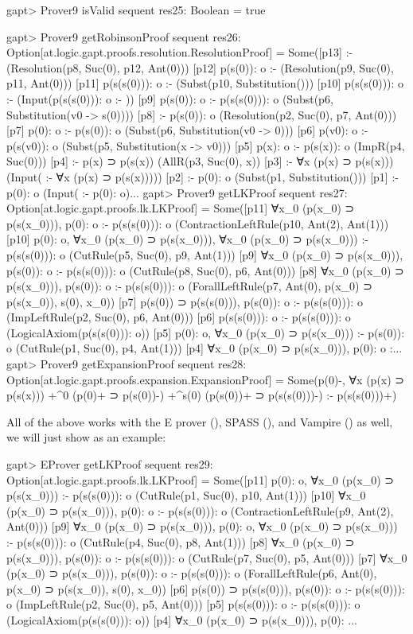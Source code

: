 \documentclass[a4paper,11pt]{article}
\newcommand{\cli}[1]{{\ttfamily {#1}}}
\begin{document}
\begin{clilisting}
gapt> Prover9 isValid sequent
res25: Boolean = true

gapt> Prover9 getRobinsonProof sequent
res26: Option[at.logic.gapt.proofs.resolution.ResolutionProof] =
Some([p13]  :-    (Resolution(p8, Suc(0), p12, Ant(0)))
[p12] p(s(0)): o :-    (Resolution(p9, Suc(0), p11, Ant(0)))
[p11] p(s(s(0))): o :-    (Subst(p10, Substitution()))
[p10] p(s(s(0))): o :-    (Input(p(s(s(0))): o :- ))
[p9] p(s(0)): o :- p(s(s(0))): o   (Subst(p6, Substitution(v0 -> s(0))))
[p8]  :- p(s(0)): o   (Resolution(p2, Suc(0), p7, Ant(0)))
[p7] p(0): o :- p(s(0)): o   (Subst(p6, Substitution(v0 -> 0)))
[p6] p(v0): o :- p(s(v0)): o   (Subst(p5, Substitution(x -> v0)))
[p5] p(x): o :- p(s(x)): o   (ImpR(p4, Suc(0)))
[p4]  :- p(x) ⊃ p(s(x))   (AllR(p3, Suc(0), x))
[p3]  :- ∀x (p(x) ⊃ p(s(x)))   (Input( :- ∀x (p(x) ⊃ p(s(x)))))
[p2]  :- p(0): o   (Subst(p1, Substitution()))
[p1]  :- p(0): o   (Input( :- p(0): o)...
gapt> Prover9 getLKProof sequent
res27: Option[at.logic.gapt.proofs.lk.LKProof] =
Some([p11] ∀x_0 (p(x_0) ⊃ p(s(x_0))), p(0): o :- p(s(s(0))): o    (ContractionLeftRule(p10, Ant(2), Ant(1)))
[p10] p(0): o, ∀x_0 (p(x_0) ⊃ p(s(x_0))), ∀x_0 (p(x_0) ⊃ p(s(x_0))) :- p(s(s(0))): o    (CutRule(p5, Suc(0), p9, Ant(1)))
[p9] ∀x_0 (p(x_0) ⊃ p(s(x_0))), p(s(0)): o :- p(s(s(0))): o    (CutRule(p8, Suc(0), p6, Ant(0)))
[p8] ∀x_0 (p(x_0) ⊃ p(s(x_0))), p(s(0)): o :- p(s(s(0))): o    (ForallLeftRule(p7, Ant(0), p(x_0) ⊃ p(s(x_0)), s(0), x_0))
[p7] p(s(0)) ⊃ p(s(s(0))), p(s(0)): o :- p(s(s(0))): o    (ImpLeftRule(p2, Suc(0), p6, Ant(0)))
[p6] p(s(s(0))): o :- p(s(s(0))): o    (LogicalAxiom(p(s(s(0))): o))
[p5] p(0): o, ∀x_0 (p(x_0) ⊃ p(s(x_0))) :- p(s(0)): o    (CutRule(p1, Suc(0), p4, Ant(1)))
[p4] ∀x_0 (p(x_0) ⊃ p(s(x_0))), p(0): o :...
gapt> Prover9 getExpansionProof sequent
res28: Option[at.logic.gapt.proofs.expansion.ExpansionProof] =
Some(p(0)-,
∀x (p(x) ⊃ p(s(x)))
  +^{0} (p(0)+ ⊃ p(s(0))-)
  +^{s(0)} (p(s(0))+ ⊃ p(s(s(0)))-)
:-
p(s(s(0)))+)

\end{clilisting}

All of the above works with the E prover (\cli{EProver}), SPASS (\cli{SPASS}),
and Vampire (\cli{Vampire}) as well, we will just show
\cli{EProver.getLKProof} as an example:
\begin{clilisting}
gapt> EProver getLKProof sequent
res29: Option[at.logic.gapt.proofs.lk.LKProof] =
Some([p11] p(0): o, ∀x_0 (p(x_0) ⊃ p(s(x_0))) :- p(s(s(0))): o    (CutRule(p1, Suc(0), p10, Ant(1)))
[p10] ∀x_0 (p(x_0) ⊃ p(s(x_0))), p(0): o :- p(s(s(0))): o    (ContractionLeftRule(p9, Ant(2), Ant(0)))
[p9] ∀x_0 (p(x_0) ⊃ p(s(x_0))), p(0): o, ∀x_0 (p(x_0) ⊃ p(s(x_0))) :- p(s(s(0))): o    (CutRule(p4, Suc(0), p8, Ant(1)))
[p8] ∀x_0 (p(x_0) ⊃ p(s(x_0))), p(s(0)): o :- p(s(s(0))): o    (CutRule(p7, Suc(0), p5, Ant(0)))
[p7] ∀x_0 (p(x_0) ⊃ p(s(x_0))), p(s(0)): o :- p(s(s(0))): o    (ForallLeftRule(p6, Ant(0), p(x_0) ⊃ p(s(x_0)), s(0), x_0))
[p6] p(s(0)) ⊃ p(s(s(0))), p(s(0)): o :- p(s(s(0))): o    (ImpLeftRule(p2, Suc(0), p5, Ant(0)))
[p5] p(s(s(0))): o :- p(s(s(0))): o    (LogicalAxiom(p(s(s(0))): o))
[p4] ∀x_0 (p(x_0) ⊃ p(s(x_0))), p(0): ...
\end{clilisting}
\end{document}
